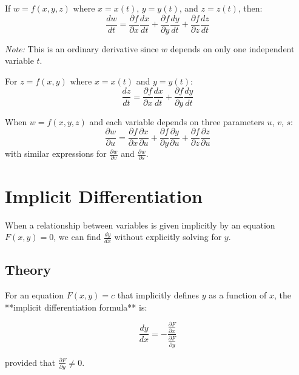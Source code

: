 \begin{eg}
  If \(w = f(x, y, z)\) where \(x = x(t)\), \(y = y(t)\), and \(z = z(t)\), then:
  \[
    \frac{dw}{dt} = \frac{\partial f}{\partial x} \frac{dx}{dt} + \frac{\partial f}{\partial y} \frac{dy}{dt} + \frac{\partial f}{\partial z} \frac{dz}{dt}
  \]

  \textit{Note:} This is an ordinary derivative since \(w\) depends on only one independent variable \(t\).
\end{eg}

\begin{eg}
  For \(z = f(x, y)\) where \(x = x(t)\) and \(y = y(t)\):
  \[
    \frac{dz}{dt} = \frac{\partial f}{\partial x} \frac{dx}{dt} + \frac{\partial f}{\partial y} \frac{dy}{dt}
  \]
\end{eg}

\begin{eg}
  When \(w = f(x, y, z)\) and each variable depends on three parameters \(u\), \(v\), \(s\):
  \[
    \frac{\partial w}{\partial u} = \frac{\partial f}{\partial x} \frac{\partial x}{\partial u} + \frac{\partial f}{\partial y} \frac{\partial y}{\partial u} + \frac{\partial f}{\partial z} \frac{\partial z}{\partial u}
  \]
  with similar expressions for \(\frac{\partial w}{\partial v}\) and \(\frac{\partial w}{\partial s}\).
\end{eg}

\section{Implicit Differentiation}
\label{sec:implicit-differentiation}

When a relationship between variables is given implicitly by an equation \(F(x, y) = 0\), we can find \(\frac{dy}{dx}\) without explicitly solving for \(y\).

\subsection{Theory}

For an equation \(F(x, y) = c\) that implicitly defines \(y\) as a function of \(x\), the **implicit differentiation formula** is:

\[
  \frac{dy}{dx} = -\frac{\frac{\partial F}{\partial x}}{\frac{\partial F}{\partial y}}
\]

provided that \(\frac{\partial F}{\partial y} \neq 0\).

